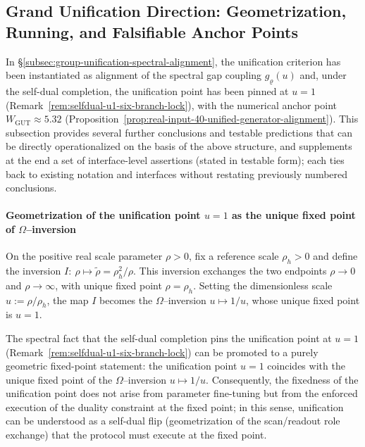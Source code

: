 \subsection{Grand Unification Direction: Geometrization, Running, and Falsifiable Anchor Points}\label{subsec:group-unification-gut-forward}

In \S\ref{subsec:group-unification-spectral-alignment}, the unification criterion has been instantiated as alignment of the spectral gap coupling \(g_{\varrho}(u)\) and, under the self-dual completion, the unification point has been pinned at \(u=1\) (Remark~\ref{rem:selfdual-u1-six-branch-lock}), with the numerical anchor point \(W_{\mathrm{GUT}}\approx 5.32\) (Proposition~\ref{prop:real-input-40-unified-generator-alignment}). This subsection provides several further conclusions and testable predictions that can be directly operationalized on the basis of the above structure, and supplements at the end a set of interface-level assertions (stated in testable form); each ties back to existing notation and interfaces without restating previously numbered conclusions.

\paragraph{Geometrization of the unification point \(u=1\) as the unique fixed point of \(\Omega\)--inversion}
On the positive real scale parameter \(\rho>0\), fix a reference scale \(\rho_h>0\) and define the inversion
\(
I:\ \rho\mapsto\tilde\rho=\rho_h^2/\rho
\).
This inversion exchanges the two endpoints \(\rho\to 0\) and \(\rho\to\infty\), with unique fixed point \(\rho=\rho_h\).
Setting the dimensionless scale \(u:=\rho/\rho_h\), the map \(I\) becomes the \(\Omega\)--inversion \(u\mapsto 1/u\), whose unique fixed point is \(u=1\).

\begin{proposition}\label{prop:u1-throat-identity}
The spectral fact that the self-dual completion pins the unification point at \(u=1\) (Remark~\ref{rem:selfdual-u1-six-branch-lock}) can be promoted to a purely geometric fixed-point statement: the unification point \(u=1\) coincides with the unique fixed point of the \(\Omega\)--inversion \(u\mapsto 1/u\).
Consequently, the fixedness of the unification point does not arise from parameter fine-tuning but from the enforced execution of the duality constraint at the fixed point; in this sense, unification can be understood as a self-dual flip (geometrization of the scan/readout role exchange) that the protocol must execute at the fixed point.
\end{proposition}

